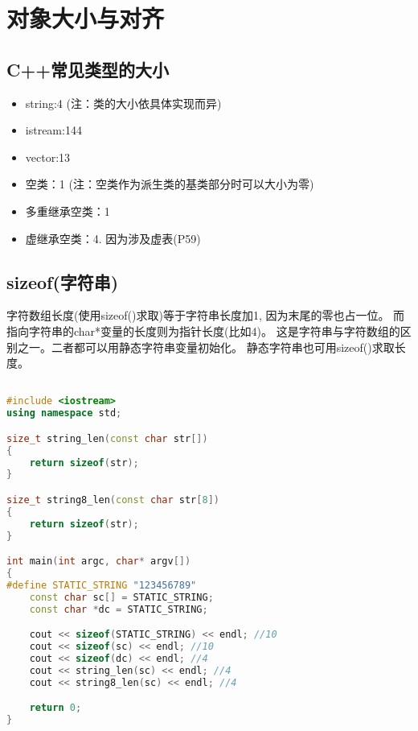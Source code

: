\section{对象大小与对齐}

\subsection{C++常见类型的大小}
\begin{itemize}
    \item string:4 (注：类的大小依具体实现而异)
    \item istream:144
    \item vector:13
    \item 空类：1 (注：空类作为派生类的基类部分时可以大小为零)
    \item 多重继承空类：1
    \item 虚继承空类：4. 因为涉及虚表(\cite{pibible}P59)
\end{itemize}

\subsection{sizeof(字符串)}
字符数组长度(使用sizeof()求取)等于字符串长度加1, 因为末尾的零也占一位。
而指向字符串的char*变量的长度则为指针长度(比如4)。
这是字符串与字符数组的区别之一。二者都可以用静态字符串变量初始化。
静态字符串也可用sizeof()求取长度。


\begin{lstlisting}[language=C++]

#include <iostream>
using namespace std;

size_t string_len(const char str[])
{
    return sizeof(str);
}

size_t string8_len(const char str[8])
{
    return sizeof(str);
}

int main(int argc, char* argv[])
{
#define STATIC_STRING "123456789"
    const char sc[] = STATIC_STRING;
    const char *dc = STATIC_STRING;

    cout << sizeof(STATIC_STRING) << endl; //10
    cout << sizeof(sc) << endl; //10
    cout << sizeof(dc) << endl; //4
    cout << string_len(sc) << endl; //4
    cout << string8_len(sc) << endl; //4

    return 0;
}                                           

\end{lstlisting}



